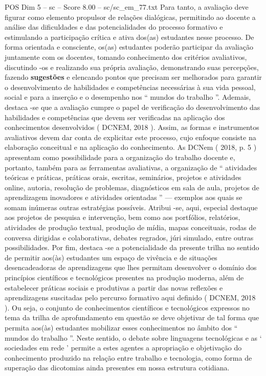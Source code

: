 \begin{textsample}{POS Dim 5 – sc – Score 8.00 – sc/sc\_em\_77.txt}
Para tanto, a avaliação deve figurar como elemento propulsor de relações dialógicas, permitindo ao docente a análise das dificuldades e das potencialidades do processo formativo e estimulando a participação crítica e ativa dos(as) estudantes nesse processo.
De forma orientada e consciente, os(as) estudantes poderão participar da avaliação juntamente com os docentes, tomando conhecimento dos critérios avaliativos, discutindo -os e realizando sua própria avaliação, demonstrando suas percepções, fazendo \textbf{sugestões} e elencando pontos que precisam ser melhorados para garantir o desenvolvimento de habilidades e competências necessárias à sua vida pessoal, social e para a inserção e o desempenho nos “ mundos do trabalho ”.
Ademais, destaca -se que a avaliação cumpre o papel de verificação do desenvolvimento das habilidades e competências que devem ser verificadas na aplicação dos conhecimentos desenvolvidos ( DCNEM, 2018 ).
Assim, as formas e instrumentos avaliativos devem dar conta de explicitar este processo, cujo enfoque consiste na elaboração conceitual e na aplicação do conhecimento.
As DCNem ( 2018, p. 5 ) apresentam como possibilidade para a organização do trabalho docente e, portanto, também para as ferramentas avaliativas, a organização de “ atividades teóricas e práticas, práticas orais, escritas, seminários, projetos e atividades online, autoria, resolução de problemas, diagnósticos em sala de aula, projetos de aprendizagem inovadores e atividades orientadas ” — exemplos aos quais se somam inúmeras outras estratégias possíveis.
Atribui -se, aqui, especial destaque aos projetos de pesquisa e intervenção, bem como aos portfólios, relatórios, atividades de produção textual, produção de mídia, mapas conceituais, rodas de conversa dirigidas e colaborativas, debates regrados, júri simulado, entre outras possibilidades.
Por fim, destaca -se a potencialidade da presente trilha no sentido de permitir aos(às) estudantes um espaço de vivência e de situações desencadeadoras de aprendizagens que lhes permitam desenvolver o domínio dos princípios científicos e tecnológicos presentes na produção moderna, além de estabelecer práticas sociais e produtivas a partir das novas reflexões e aprendizagens suscitadas pelo percurso formativo aqui definido ( DCNEM, 2018 ).
Ou seja, o conjunto de conhecimentos científicos e tecnológicos expressos no tema da trilha de aprofundamento em questão se deve objetivar de tal forma que permita aos(às) estudantes mobilizar esses conhecimentos no âmbito dos “ mundos do trabalho ”.
Neste sentido, o debate sobre linguagens tecnológicas e as ‘ sociedades em rede ’ permite a estes agentes a apropriação e objetivação do conhecimento produzido na relação entre trabalho e tecnologia, como forma de superação das dicotomias ainda presentes em nossa estrutura cotidiana.

\end{textsample}
